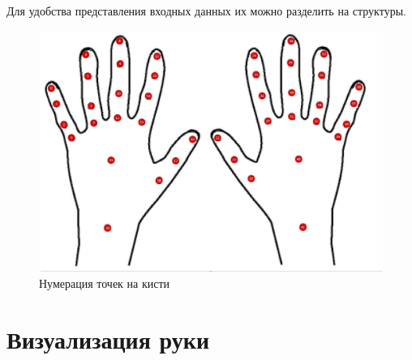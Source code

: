 \hspace{0.6cm}Для удобства представления входных данных их можно разделить на структуры. 
\begin{figure}[ht!]
	\centering
	\includegraphics[scale=0.4]{Kist.jpg}
	\caption{Нумерация точек на кисти}
	\label{fig:hands}
\end{figure}

\section{Визуализация руки}

